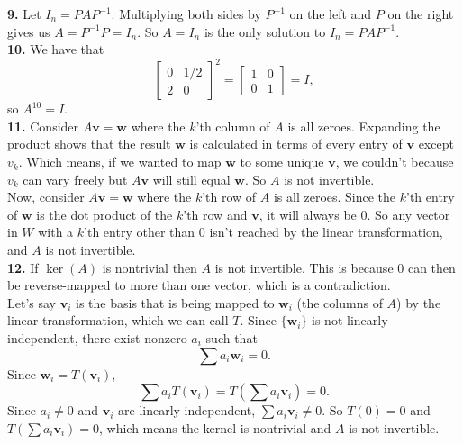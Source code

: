 \documentclass{article}
\newcommand{\bv}{\mathbf{v}}
\newcommand{\bw}{\mathbf{w}}
\begin{document}
\textbf{9.} Let $I_n = PAP^{-1}$. Multiplying both sides by $P^{-1}$ on the left and $P$ on the right gives us $A = P^{-1}P = I_n$. So $A = I_n$ is the only solution to $I_n = PAP^{-1}$. \\

\textbf{10.} We have that
$$\begin{bmatrix}
    0 & 1/2 \\
    2 & 0
\end{bmatrix}^2
= \begin{bmatrix}
    1 & 0 \\
    0 & 1
\end{bmatrix} = I,$$
so $A^{10} = I$. \\

\textbf{11.} Consider $A\bv = \bw$ where the $k$'th column of $A$ is all zeroes. Expanding the product shows that the result $\bw$ is calculated in terms of every entry of $\bv$ except $v_k$. Which means, if we wanted to map $\bw$ to some unique $\bv$, we couldn't because $v_k$ can vary freely but $A\bv$ will still equal $\bw$. So $A$ is not invertible. \\

Now, consider $A\bv = \bw$ where the $k$'th row of $A$ is all zeroes. Since the $k$'th entry of $\bw$ is the dot product of the $k$'th row and $\bv$, it will always be $0$. So any vector in $W$ with a $k$'th entry other than $0$ isn't reached by the linear transformation, and $A$ is not invertible. \\

\textbf{12.} If $\ker(A)$ is nontrivial then $A$ is not invertible. This is because $0$ can then be reverse-mapped to more than one vector, which is a contradiction. \\

Let's say $\bv_i$ is the basis that is being mapped to $\bw_i$ (the columns of $A$) by the linear transformation, which we can call $T$. Since $\{\bw_i\}$ is not linearly independent, there exist nonzero $a_i$ such that
$$\sum a_i\bw_i = 0.$$
Since $\bw_i = T(\bv_i)$,
$$\sum a_i T(\bv_i) = T\left(\sum a_i \bv_i\right) = 0.$$
Since $a_i \neq 0$ and $\bv_i$ are linearly independent, $\sum a_i \bv_i \neq 0$. So $T(0) = 0$ and $T\left(\sum a_i \bv_i\right) = 0$, which means the kernel is nontrivial and $A$ is not invertible.
\end{document}
